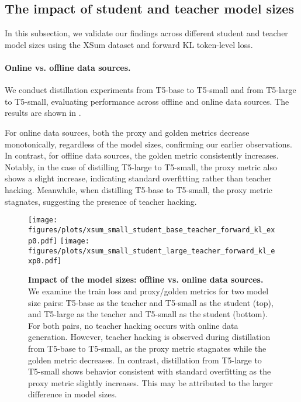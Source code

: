 \subsection{The impact of student and teacher model sizes}

In this subsection, we validate our findings across different student and teacher model sizes using the XSum dataset and forward KL token-level loss.

\paragraph{Online vs. offline data sources.}
We conduct distillation experiments from T5-base to T5-small and from T5-large to T5-small, evaluating performance across offline and online data sources. The results are shown in .

For online data sources, both the proxy and golden metrics decrease monotonically, regardless of the model sizes, confirming our earlier observations. In contrast, for offline data sources, the golden metric consistently increases. Notably, in the case of distilling T5-large to T5-small, the proxy metric also shows a slight increase, indicating standard overfitting rather than teacher hacking. Meanwhile, when distilling T5-base to T5-small, the proxy metric stagnates, suggesting the presence of teacher hacking.

\begin{figure}[ht]
    \centering
    \texttt{[image: figures/plots/xsum\_small\_student\_base\_teacher\_forward\_kl\_exp0.pdf]}
    \texttt{[image: figures/plots/xsum\_small\_student\_large\_teacher\_forward\_kl\_exp0.pdf]}
    \caption{\textbf{Impact of the model sizes: offline vs. online data sources.} 
    We examine the train loss and proxy/golden metrics for two model size pairs: T5-base as the teacher and T5-small as the student (top), and T5-large as the teacher and T5-small as the student (bottom). For both pairs, no teacher hacking occurs with online data generation. However, teacher hacking is observed during distillation from T5-base to T5-small, as the proxy metric stagnates while the golden metric decreases. In contrast, distillation from T5-large to T5-small shows behavior consistent with standard overfitting as the proxy metric slightly increases. This may be attributed to the larger difference in model sizes.
    }
    \label{fig:sizes_exp_large_to_base_online_fwd_kl}
\end{figure}

